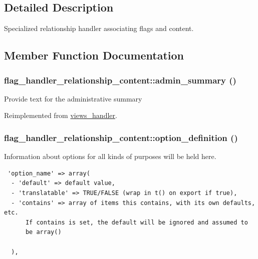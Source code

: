 \subsection{Detailed Description}
Specialized relationship handler associating flags and content. 

\subsection{Member Function Documentation}
\hypertarget{classflag__handler__relationship__content_d5dd884b0fe1765d43a268baf16057ef}{
\subsubsection[{admin\_\-summary}]{\setlength{\rightskip}{0pt plus 5cm}flag\_\-handler\_\-relationship\_\-content::admin\_\-summary ()}}
\label{classflag__handler__relationship__content_d5dd884b0fe1765d43a268baf16057ef}


Provide text for the administrative summary 

Reimplemented from \hyperlink{classviews__handler_27a5cb35f3f17322957730a95b6be11e}{views\_\-handler}.\hypertarget{classflag__handler__relationship__content_54e7c1074698289ef34aa1cdd31db4bf}{
\subsubsection[{option\_\-definition}]{\setlength{\rightskip}{0pt plus 5cm}flag\_\-handler\_\-relationship\_\-content::option\_\-definition ()}}
\label{classflag__handler__relationship__content_54e7c1074698289ef34aa1cdd31db4bf}


Information about options for all kinds of purposes will be held here. 

\begin{Code}\begin{verbatim} 'option_name' => array(
  - 'default' => default value,
  - 'translatable' => TRUE/FALSE (wrap in t() on export if true),
  - 'contains' => array of items this contains, with its own defaults, etc.
      If contains is set, the default will be ignored and assumed to
      be array()

  ),
\end{verbatim}
\end{Code}

